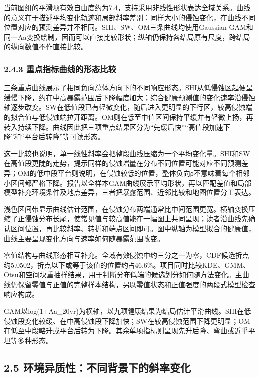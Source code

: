 \documentclass[
  11pt,
  a4paper,
]{ctexart}
\begin{document}
当前图组的平滑项有效自由度约为7.4，支持采用非线性形状表达全域关系。曲线的意义在于描述平均变化轨迹和局部斜率差别：同样大小的侵蚀变化，在曲线不同位置对应的预测差异并不相同。SHI、SW、OM三条曲线均使用Gaussian
GAM和同一Aa变换绘制，因而可以直接比较形状；纵轴仍保持各结局原有尺度，跨结局的纵向数值不作直接比较。

\hypertarget{ux91cdux70b9ux6307ux6807ux66f2ux7ebfux7684ux5f62ux6001ux6bd4ux8f83}{%
\subsubsection{2.4.3
重点指标曲线的形态比较}\label{ux91cdux70b9ux6307ux6807ux66f2ux7ebfux7684ux5f62ux6001ux6bd4ux8f83}}

三条重点曲线展示了相同负向总体方向下的不同响应形态。SHI从低侵蚀区起便呈缓慢下降，约在中高暴露范围后下降幅度加大；综合健康预测值的变化速率沿侵蚀轴逐步改变。SW在低值段已有轻微变化，随后进入更明显的下行区，较高侵蚀端的拟合值与低侵蚀端拉开距离。OM则在低至中值区间保持平缓并有轻微上扬，再转入持续下降。曲线因此把三项重点结果区分为``先缓后快''``高值段加速下降''和``平台后转降''等可读形态。

这一比较也说明，单一线性斜率会把整段曲线压缩为一个平均变化量。SHI和SW在高值段更陡的走势，提示同样的侵蚀增量在分布不同位置可能对应不同预测差异；OM的低中段平台则说明，在侵蚀较低的位置，整体负向ρ不意味着每个相邻小区间都严格下降。报告以全样本GAM曲线展示平均形状，再以匹配差值和局部模型补充环境条件及地点差异，三者把暴露范围、近邻比较和地图位置分工表达。

浅色区间带显示曲线估计范围，在侵蚀分布两端通常比中间范围更宽。横轴变换压缩了正侵蚀分布长尾，使常见值与较高值能在一幅图上共同呈现；读者沿曲线先确认区间位置，再比较斜率、转折和端点区间即可。图中纵轴为模型拟合的健康值，曲线主要呈现变化方向与速率如何随暴露范围改变。

零值结构与曲线形态相互补充。全域有效侵蚀中约三分之一为零，CDF候选折点约5.0502，折点以下或等于该值的位置约占46.6\%。项目同时比较KDE、GMM、Otsu和空间块重抽样结果，用于判断分布低端的候选划分如何随方法变化。主曲线仍保留零值与正值的完整样本结构，另以零值状态和正值强度的两段式模型检查响应构成。

GAM以log(1+Aa\_20yr)为横轴，以九项健康结果为结局估计平滑曲线。SHI在低侵蚀段变化较缓、在中高侵蚀段下降加快；SW在较高侵蚀范围下降更明显；OM在低至中段略升或平台后转为下降。其余单项指标则呈现先升后降、弯曲或近乎平坦等多种形态。

\hypertarget{ux73afux5883ux5f02ux8d28ux6027ux4e0dux540cux80ccux666fux4e0bux7684ux659cux7387ux53d8ux5316}{%
\subsection{2.5
环境异质性：不同背景下的斜率变化}\label{ux73afux5883ux5f02ux8d28ux6027ux4e0dux540cux80ccux666fux4e0bux7684ux659cux7387ux53d8ux5316}}
\end{document}

